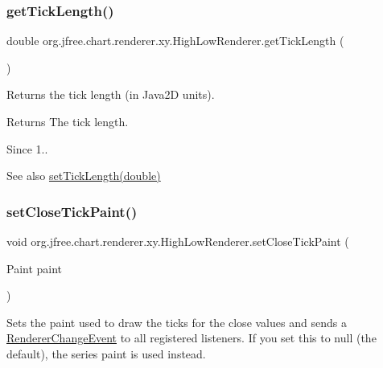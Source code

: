 \subsubsection{\texorpdfstring{get\+Tick\+Length()}{getTickLength()}}
{\footnotesize\ttfamily double org.\+jfree.\+chart.\+renderer.\+xy.\+High\+Low\+Renderer.\+get\+Tick\+Length (\begin{DoxyParamCaption}{ }\end{DoxyParamCaption})}

Returns the tick length (in Java2D units).

\begin{DoxyReturn}{Returns}
The tick length.
\end{DoxyReturn}
\begin{DoxySince}{Since}
1..
\end{DoxySince}
\begin{DoxySeeAlso}{See also}
\mbox{\hyperlink{classorg_1_1jfree_1_1chart_1_1renderer_1_1xy_1_1_high_low_renderer_a1194fdcfc70ded6eed708d56d96b0d8b}{set\+Tick\+Length(double)}} 
\end{DoxySeeAlso}
\mbox{\label{classorg_1_1jfree_1_1chart_1_1renderer_1_1xy_1_1_high_low_renderer_afda700a1415ace745064ee5f13a49c1d}} 
\subsubsection{\texorpdfstring{set\+Close\+Tick\+Paint()}{setCloseTickPaint()}}
{\footnotesize\ttfamily void org.\+jfree.\+chart.\+renderer.\+xy.\+High\+Low\+Renderer.\+set\+Close\+Tick\+Paint (\begin{DoxyParamCaption}\item[{Paint}]{paint }\end{DoxyParamCaption})}

Sets the paint used to draw the ticks for the close values and sends a \mbox{\hyperlink{}{Renderer\+Change\+Event}} to all registered listeners. If you set this to {\ttfamily null} (the default), the series paint is used instead.


